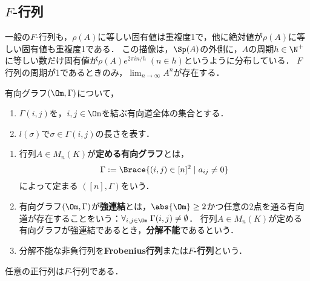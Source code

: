 \documentclass[uplatex, dvipdfmx]{jsreport}
\begin{document}
\subsection{$F$-行列}

\begin{tcolorbox}[colframe=ForestGreen, colback=ForestGreen!10!white,breakable,colbacktitle=ForestGreen!40!white,coltitle=black,fonttitle=\bfseries\sffamily,
title=]
    一般の$F$-行列も，$\rho(A)$に等しい固有値は重複度1で，他に絶対値が$\rho(A)$に等しい固有値も重複度1である．
    この描像は，$\Sp(A)$の外側に，$A$の周期$h\in\N^+$に等しい数だけ固有値が$\rho(A)e^{2\pi in/h}\;(n\in h)$というように分布している．
    $F$行列の周期が1であるときのみ，$\lim_{n\to\infty}A^n$が存在する．
\end{tcolorbox}

\begin{notation}
    有向グラフ$(\Om,\Gamma)$について，
    \begin{enumerate}
        \item $\Gamma(i,j)$を，$i,j\in\Om$を結ぶ有向道全体の集合とする．
        \item $l(\sigma)$で$\sigma\in\Gamma(i,j)$の長さを表す．
    \end{enumerate}
\end{notation}

\begin{definition}\mbox{}
    \begin{enumerate}
        \item 行列$A\in M_n(K)$が\textbf{定める有向グラフ}とは，
        \[\Gamma:=\Brace{(i,j)\in[n]^2\mid a_{ij}\ne0}\]
        によって定まる
        $([n],\Gamma)$をいう．
        \item 有向グラフ$(\Om,\Gamma)$が\textbf{強連結}とは，$\abs{\Om}\ge2$かつ任意の2点を通る有向道が存在することをいう：$\forall_{i,j\in\Om}\;\Gamma(i,j)\ne\emptyset$．
        行列$A\in M_n(K)$が定める有向グラフが強連結であるとき，\textbf{分解不能}であるという．
        \item 分解不能な非負行列を\textbf{Frobenius行列}または\textbf{$F$-行列}という．
    \end{enumerate}
    任意の正行列は$F$-行列である．
\end{definition}
\end{document}
